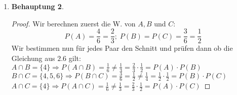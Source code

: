 \documentclass[a4paper]{scrartcl}
\newtheorem*{behaupt}{Behauptung}
\begin{document}
\begin{enumerate}[label=\bfseries\arabic*.]
\begin{enumerate}[label=(\alph*)]
            \item
                \begin{behaupt}
                    Wenn die angekreuzte Antwort korrekt ist, hat der Student
                    die richtige Antwort mit der Wahrscheinlichkeit
                    $P(A\ |\ B) = \frac{7}{8}$ gewusst.
                \end{behaupt}
                \begin{proof}
                    Da $A$ und $A^C$ eine disjunkte Zerlegung von $\Omega$
                    bilden, lässt sich der Satz von Bayes anwenden, um
                    $P(A\ |\ B)$ zu berechnen.
                    \begin{equation*}
                        \begin{split}
                            P(A\ |\ B) &= \frac{P(B\ |\ A) \cdot P(A)}
                            {P(B\ |\ A) \cdot P(A) + P(B\ |\ A^C) \cdot P(A^C)}
                            \\
                            &= \frac{P(B\ |\ A) \cdot P(A)}{P(B)} \\
                            &= \frac{1 \cdot \num{0.7}}{\num{0.8}} \\
                            &= \frac{7}{8}
                        \end{split}
                    \end{equation*}
                \end{proof}

        \end{enumerate}

    \item	        
        	\begin{behaupt}
        	
        	\end{behaupt}
        	\begin{proof}
        	Wir berechnen zuerst die W. von $A,B$ und $C$:
			\begin{equation*}
			P(A)=\frac{4}{6}=\frac{2}{3};\; P(B)=P(C)=\frac{3}{6}=\frac{1}{2}
			\end{equation*}
			Wir bestimmen nun für jedes Paar den Schnitt und prüfen dann ob die Gleichung aus $2.6$ gilt:\\     
        	$A\cap B=\{4\}\Rightarrow P(A\cap B)=\frac{1}{6}\ne \frac{1}{3} = 
        	\frac{2}{3}\cdot \frac{1}{2} =P(A)\cdot P(B)$\\
        	$B\cap C=\{4,5,6\}\Rightarrow P(B\cap C)=\frac{3}{6}=\frac{1}{2} \ne \frac{1}{4} =
        	\frac{1}{2}\cdot \frac{1}{2} =P(B)\cdot P(C)$\\
        	$A\cap C=\{4\}\Rightarrow P(A\cap C)=\frac{1}{6}\ne \frac{1}{3} =
        	\frac{2}{3}\cdot \frac{1}{2} =P(A)\cdot P(C)$
        	\end{proof}
        	

\end{enumerate}
\end{document}
